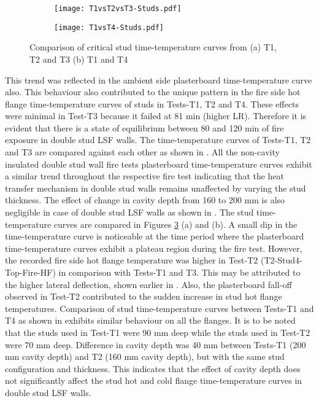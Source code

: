 \begin{figure}[!htbp]
	\centering
	\begin{subfigure}[b]{0.7\textwidth}
		\centering
		\texttt{[image: T1vsT2vsT3-Studs.pdf]}
		\caption{}
		\label{subfig:T1vsT2vsT3-Studs}
	\end{subfigure}
	\begin{subfigure}[b]{0.7\textwidth}
		\centering
		\texttt{[image: T1vsT4-Studs.pdf]}
		\caption{}
		\label{subfig:T1vsT4-Studs}
	\end{subfigure}
	   \caption{Comparison of critical stud time-temperature curves from (a) T1, T2 and T3 (b) T1 and T4}
	   \label{fig:T1vsT2vsT3vsT4-Studs}
\end{figure}

This trend was reflected in the ambient side plasterboard time-temperature curve also. This behaviour also contributed to the unique pattern in the fire side hot flange time-temperature curves of studs in Tests-T1, T2 and T4. These effects were minimal in Test-T3 because it failed at 81 min (higher LR). Therefore it is evident that there is a state of equilibrium between 80 and 120 min of fire exposure in double stud LSF walls. The time-temperature curves of Tests-T1, T2 and T3 are compared against each other as shown in . All the non-cavity insulated double stud wall fire tests plasterboard time-temperature curves exhibit a similar trend throughout the respective fire test indicating that the heat transfer mechanism in double stud walls remains unaffected by varying the stud thickness. The effect of change in cavity depth from 160 to 200 mm is also negligible in case of double stud LSF walls as shown in . The stud time-temperature curves are compared in Figures \ref{fig:T1vsT2vsT3vsT4-Studs} (a) and (b). A small dip in the time-temperature curve is noticeable at the time period where the plasterboard time-temperature curves exhibit a plateau region during the fire test. However, the recorded fire side hot flange temperature was higher in Test-T2 (T2-Stud4-Top-Fire-HF) in comparison with Tests-T1 and T3. This may be attributed to the higher lateral deflection, shown earlier in . Also, the plasterboard fall-off observed in Test-T2 contributed to the sudden increase in stud hot flange temperatures. Comparison of stud time-temperature curves between Tests-T1 and T4 as shown in  exhibits similar behaviour on all the flanges. It is to be noted that the studs used in Test-T1 were 90 mm deep while the studs used in Test-T2 were 70 mm deep. Difference in cavity depth was 40 mm between Tests-T1 (200 mm cavity depth) and T2 (160 mm cavity depth), but with the same stud configuration and thickness. This indicates that the effect of cavity depth does not significantly affect the stud hot and cold flange time-temperature curves in double stud LSF walls. 


